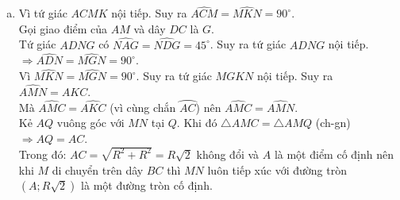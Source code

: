 \begin{ex}
{\begin{enumerate}[a)]
{}
	Vì $FE=FP$ và $FE=FB$ do đó $FB=FP$ mà $F\in BP\Rightarrow BP=2FB$.\\
	Suy ra $\dfrac{IH}{FB}=\dfrac{MH}{2FB}\Rightarrow MH=2IH$. Suy ra $AF$ đi qua trung điểm $I$ của $MH$.
	\item 
	Vì tứ giác $ACMK$ nội tiếp. Suy ra $\widehat{ACM}=\widehat{MKN}=90^{\circ}$.\\
	Gọi giao điểm của $AM$ và dây $DC$ là $G$.\\
	Tứ giác $ADNG$ có $\widehat{NAG}=\widehat{NDG}=45^{\circ}$. Suy ra tứ giác $ADNG$ nội tiếp.\\
	$\Rightarrow \widehat{ADN}=\widehat{MGN}=90^{\circ}$.\\
	Vì  $\widehat{MKN}=\widehat{MGN}=90^{\circ}$. Suy ra tứ giác $MGKN$ nội tiếp. Suy ra $\widehat{AMN}=\widehat{AKC}$.\\
	Mà $\widehat{AMC}=\widehat{AKC}$ (vì cùng chắn $\wideparen{AC}$) nên $\widehat{AMC}=\widehat{AMN}$.\\
	Kẻ $AQ$ vuông góc với $MN$ tại $Q$. Khi đó $\triangle AMC=\triangle AMQ$ (ch-gn) $\Rightarrow AQ=AC$.\\
	Trong đó: $AC=\sqrt{R^2+R^2}=R\sqrt{2}$ không đổi và $A$ là một điểm cố định nên khi $M$ di chuyển trên dây $BC$ thì $MN$ luôn tiếp xúc với đường tròn $(A;R\sqrt{2})$ là một đường tròn cố định.
	\begin{center}
\end{center}
\end{enumerate}}
\end{ex}

